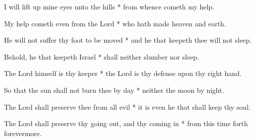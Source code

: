 \begin{multicols}{2}
	
	I will lift up mine eyes unto the hills * from whence cometh my help.
	
	My help cometh even from the Lord * who hath made heaven and earth.
	
	He will not suffer thy foot to be moved * and he that keepeth thee will not sleep.
	
	Behold, he that keepeth Israel * shall neither slumber nor sleep.
	
	The Lord himself is thy keeper * the Lord is thy defense upon thy right hand.
	
	So that the sun shall not burn thee by day * neither the moon by night.
	
	The Lord shall preserve thee from all evil * it is even he that shall keep thy soul.
	
	The Lord shall preserve thy going out, and thy coming in * from this time forth forevermore.
	
	\gloria{}
\end{multicols}